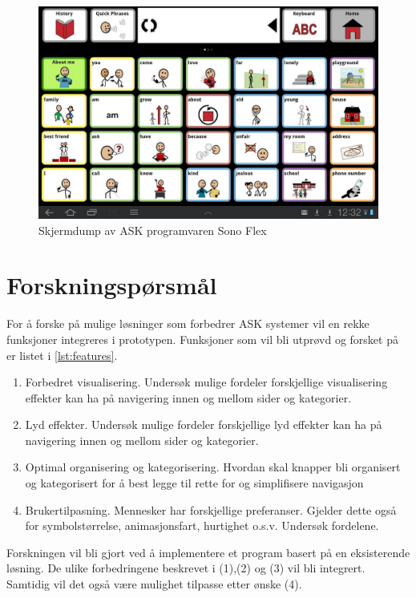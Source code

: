 \documentclass[phd,tocprelim]{cornell}
\begin{document}
\begin{figure}[ht!]
\centering
\includegraphics[width=150mm]{SonoFlex2}
\caption{Skjermdump av ASK programvaren Sono Flex}
\label{fig:SonoFlex}
\end{figure}


\section{Forskningspørsmål}
\label{sec:ResearchQuestion}

For å forske på mulige løsninger som forbedrer ASK systemer vil en rekke funksjoner integreres i prototypen. Funksjoner som vil bli utprøvd og forsket på er listet i \ref{lst:features}.


\begin{enumerate} 
\label{lst:features}
\item Forbedret visualisering. Undersøk mulige fordeler forskjellige visualisering effekter kan ha på navigering innen og mellom sider og kategorier.
\item Lyd effekter. Undersøk mulige fordeler forskjellige lyd effekter kan ha på navigering innen og mellom sider og kategorier.
\item Optimal organisering og kategorisering. Hvordan skal knapper bli organisert og kategorisert for å best legge til rette for og simplifisere navigasjon
\item Brukertilpasning. Mennesker har forskjellige preferanser. Gjelder dette også for symbolstørrelse, animasjonsfart, hurtighet o.s.v. Undersøk fordelene.  
\end{enumerate} 


Forskningen vil bli gjort ved å implementere et program basert på en eksisterende løsning. De ulike forbedringene beskrevet i (1),(2) og (3) vil bli integrert. Samtidig vil det også være mulighet tilpasse etter ønske (4). 
\end{document}

